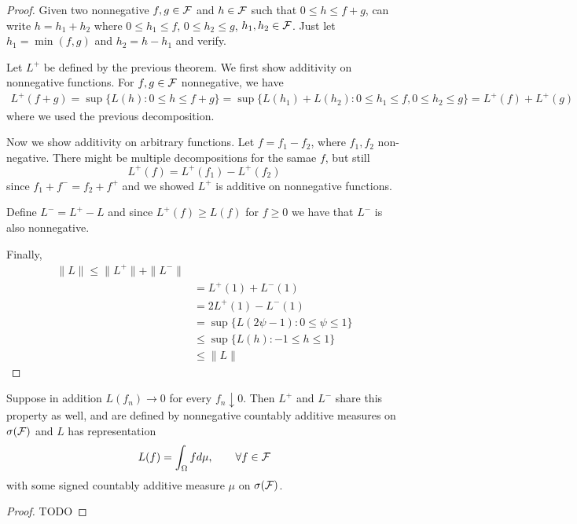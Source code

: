 \begin{proof}
  Given two nonnegative $f,g \in \mathcal{F}$ and $h \in \mathcal{F}$ such that
  $0 \leq h \leq f + g$, can write $h = h_1 + h_2$ where
  $0 \leq h_1 \leq f$, $0 \leq h_2 \leq g$, $h_1, h_2 \in \mathcal{F}$.
  Just let $h_1 = \min(f,g)$ and $h_2 = h - h_1$ and verify.

  Let $L^+$ be defined by the previous theorem. We first
  show additivity on nonnegative functions.
  For $f,g \in \mathcal{F}$ nonnegative, we have
  \begin{align*}
    L^+(f+g) = \sup \{L(h) : 0 \leq h \leq f + g\}
    = \sup\{ L(h_1) + L(h_2) : 0 \leq h_1 \leq f, 0 \leq h_2 \leq g\}
    = L^+(f) + L^+(g)
  \end{align*}
  where we used the previous decomposition.

  Now we show additivity on arbitrary functions.
  Let $f = f_1 - f_2$, where $f_1, f_2$ non-negative. There might be
  multiple decompositions for the samae $f$, but still
  \[
    L^+(f) = L^+(f_1) - L^+(f_2)
  \]
  since $f_1 + f^- = f_2 + f^+$ and we showed $L^+$ is additive on nonnegative
  functions.

  Define $L^- =  L^+ - L$ and since $L^+(f) \geq L(f)$ for $f \geq 0$
  we have that $L^-$ is also nonnegative.

  Finally,
  \begin{align*}
    \|L\| \leq \|L^+\| + \|L^-\| \\
    &= L^+(1) + L^-(1) \\
    &= 2L^+(1) - L^-(1) \\
    &= \sup\{L(2\psi-1) : 0 \leq \psi \leq 1 \} \\
    &\leq \sup \{ L(h) : -1 \leq h \leq 1 \} \\
    &\leq \|L\|
  \end{align*}
\end{proof}

\begin{corollary}
  \label{corr:lin-ftl-repr-meas}
  Suppose in addition $L(f_n) \to 0$ for every
  $f_n \downarrow 0$. Then $L^+$ and $L^-$
  share this property as well, and are defined by nonnegative
  countably additive measures on $\sigma(\mathcal{F})$
  and $L$ has representation
  \[
    L(f) = \int_\Omega f d\mu, \qquad \forall f \in \mathcal{F}
  \]
  with some signed countably additive measure $\mu$ on $\sigma(\mathcal{F})$.
\end{corollary}

\begin{proof}
  TODO
\end{proof}

